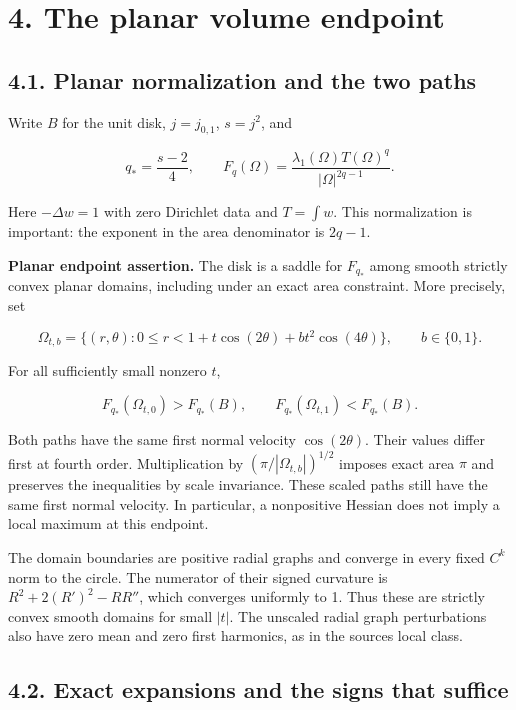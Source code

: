 \documentclass[11pt]{article}
\begin{document}
\section{4. The planar volume
endpoint}\label{the-planar-volume-endpoint}

\subsection{4.1. Planar normalization and the two
paths}\label{planar-normalization-and-the-two-paths}

Write \(B\) for the unit disk, \(j=j_{0,1}\), \(s=j^2\), and

\[
q_* = \frac{s-2}{4},\qquad
F_q(\Omega)=\frac{\lambda_1(\Omega)T(\Omega)^q}{|\Omega|^{2q-1}}.
\tag{4.1}
\]

Here \(-\Delta w=1\) with zero Dirichlet data and \(T=\int w\). This
normalization is important: the exponent in the area denominator is
\(2q-1\).

\textbf{Planar endpoint assertion.} The disk is a saddle for \(F_{q_*}\)
among smooth strictly convex planar domains, including under an exact
area constraint. More precisely, set

\[
\Omega_{t,b}=\{(r,\theta):0\le r<1+t\cos(2\theta)+bt^2\cos(4\theta)\},
\qquad b\in\{0,1\}.
\tag{4.2}
\]

For all sufficiently small nonzero \(t\),

\[
F_{q_*}(\Omega_{t,0})>F_{q_*}(B),\qquad
F_{q_*}(\Omega_{t,1})<F_{q_*}(B).
\tag{4.3}
\]

Both paths have the same first normal velocity \(\cos(2\theta)\). Their
values differ first at fourth order. Multiplication by
\((\pi/|\Omega_{t,b}|)^{1/2}\) imposes exact area \(\pi\) and preserves
the inequalities by scale invariance. These scaled paths still have the
same first normal velocity. In particular, a nonpositive Hessian does
not imply a local maximum at this endpoint.

The domain boundaries are positive radial graphs and converge in every
fixed \(C^k\) norm to the circle. The numerator of their signed
curvature is \(R^2+2(R')^2-RR''\), which converges uniformly to 1. Thus
these are strictly convex smooth domains for small \(|t|\). The unscaled
radial graph perturbations also have zero mean and zero first harmonics,
as in the source\textquotesingle s local class.

\subsection{4.2. Exact expansions and the signs that
suffice}\label{exact-expansions-and-the-signs-that-suffice}
\end{document}
